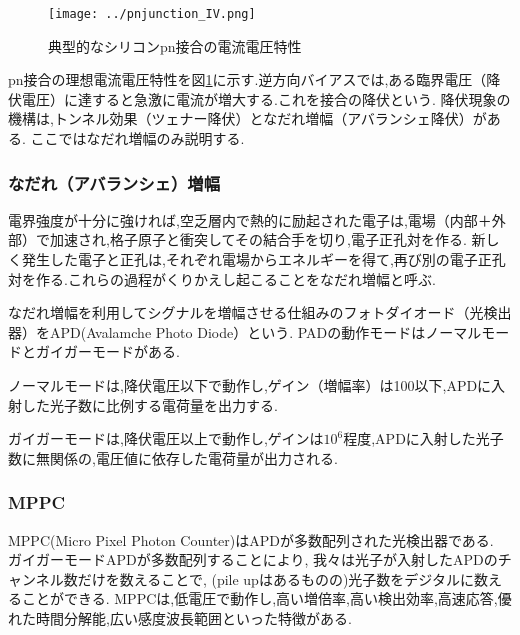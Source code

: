 \begin{figure}[h]
  \begin{center}
    \texttt{[image: ../pnjunction\_IV.png]}
  \end{center}
  \caption{典型的なシリコンpn接合の電流電圧特性}\label{fig.pnIV}
\end{figure}

pn接合の理想電流電圧特性を図\ref{fig.pnIV}に示す.逆方向バイアスでは,ある臨界電圧（降伏電圧）に達すると急激に電流が増大する.これを接合の降伏という.
降伏現象の機構は,トンネル効果（ツェナー降伏）となだれ増幅（アバランシェ降伏）がある.
ここではなだれ増幅のみ説明する.

\subsubsection{なだれ（アバランシェ）増幅}

電界強度が十分に強ければ,空乏層内で熱的に励起された電子は,電場（内部＋外部）で加速され,格子原子と衝突してその結合手を切り,電子正孔対を作る.
新しく発生した電子と正孔は,それぞれ電場からエネルギーを得て,再び別の電子正孔対を作る.これらの過程がくりかえし起こることをなだれ増幅と呼ぶ.

なだれ増幅を利用してシグナルを増幅させる仕組みのフォトダイオード（光検出器）をAPD(Avalamche Photo Diode）という.
PADの動作モードはノーマルモードとガイガーモードがある.

ノーマルモードは,降伏電圧以下で動作し,ゲイン（増幅率）は100以下,APDに入射した光子数に比例する電荷量を出力する.

ガイガーモードは,降伏電圧以上で動作し,ゲインは$10^6$程度,APDに入射した光子数に無関係の,電圧値に依存した電荷量が出力される.

\subsubsection{MPPC}
MPPC(Micro Pixel Photon Counter)はAPDが多数配列された光検出器である.
ガイガーモードAPDが多数配列することにより, 我々は光子が入射したAPDのチャンネル数だけを数えることで, (pile upはあるものの)光子数をデジタルに数えることができる.
MPPCは,低電圧で動作し,高い増倍率,高い検出効率,高速応答,優れた時間分解能,広い感度波長範囲といった特徴がある.

